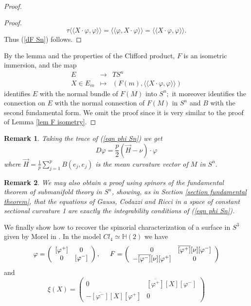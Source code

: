 \documentclass{amsart}
\newtheorem{rem}{Remark}
\begin{document}
\begin{proof}
\begin{proof}
$$\tau\langle\langle X\cdot\varphi,\varphi\rangle\rangle=\langle\langle \varphi, X\cdot\varphi\rangle\rangle=\langle\langle X\cdot\varphi,\varphi\rangle\rangle.$$
Thus (\ref{dF Sn}) follows.
\end{proof}
By the lemma and the properties of the Clifford product, $F$ is an isometric immersion, and the map 
\begin{eqnarray*}
E&\rightarrow& TS^n \\
X\in E_m&\mapsto& (F(m),\langle\langle X\cdot\varphi,\varphi\rangle\rangle)
\end{eqnarray*} 
identifies $E$ with the normal bundle of $F(M)$ into $S^n;$ it moreover identifies the connection on $E$ with the normal connection of $F(M)$ in $S^n$ and $B$ with the second fundamental form. We omit the proof since it is very similar to the proof of Lemma \ref{lem F isometry}. 
\end{proof}
\begin{rem}
Taking the trace of (\ref{eqn phi Sn}) we get
\begin{equation}\label{dirac equation Sn}
D\varphi=\frac{p}{2}\left(\vec{H}-\nu\right)\cdot\varphi
\end{equation}
where $\vec{H}=\frac{1}{p}\sum_{j=1}^pB(e_j,e_j)$ is the mean curvature vector of $M$ in $S^n.$ 
\end{rem}
\begin{rem}
We may also obtain a proof using spinors of the fundamental theorem of submanifold theory in $S^n$, showing, as in Section \ref{section fundamental theorem}, that the equations of Gauss, Codazzi and Ricci in a space of constant sectional curvature 1 are exactly the integrability conditions of (\ref{eqn phi Sn}).
\end{rem}
We finally show how to recover the spinorial characterization of a surface in $S^3$ given by Morel in \cite{Mo}. In the model $Cl_4\simeq \mathbb{H}(2)$ we have 
$$\varphi=\left(\begin{array}{cc}[\varphi^+]&0\\0&[\varphi^-]\end{array}\right),\hspace{.5cm}F=\left(\begin{array}{cc}0&\overline{[\varphi^+]}[\nu][\varphi^-]\\-\overline{[\varphi^-]}[\nu][\varphi^+]&0\end{array}\right)$$
and
$$\xi(X)=\left(\begin{array}{cc}0&\overline{[\varphi^+]}[X][\varphi^-]\\-\overline{[\varphi^-]}[X][\varphi^+]&0\end{array}\right)$$
\end{document}
